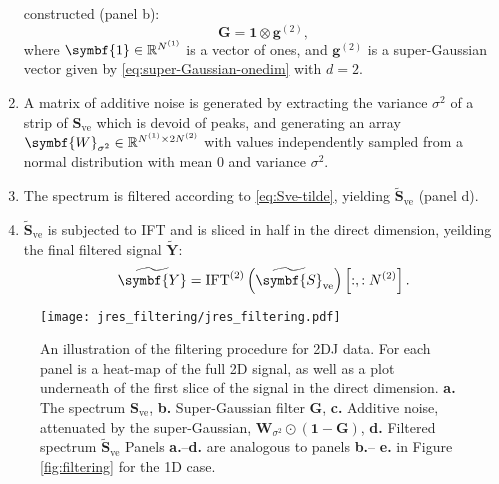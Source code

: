 \begin{enumerate}
        constructed (panel b):
        \begin{equation}
            \symbf{G} = \symbf{1} \otimes \symbf{g}^{(2)},
        \end{equation}
        where $\symbf{1} \in \mathbb{R}^{\None}$ is a vector of ones, and
        $\symbf{g}^{(2)}$ is a super-Gaussian vector given by
        \eqref{eq:super-Gaussian-onedim} with $d=2$.
    \item A matrix of additive noise is generated by extracting the variance
        $\sigma^2$ of a strip of $\symbf{S}_{\text{ve}}$ which is devoid of
        peaks, and generating an array $\symbf{W}_{\sigma^2} \in
        \mathbb{R}^{\None \times 2 \Ntwo}$ with values independently sampled
        from a normal distribution with mean $0$ and variance  $\sigma^2$.
    \item The spectrum is filtered according to \eqref{eq:Sve-tilde}, yielding
        $\widetilde{\symbf{S}}_{\text{ve}}$ (panel d).
    \item $\widetilde{\symbf{S}}_{\text{ve}}$ is subjected to \ac{IFT} and is
        sliced in half in the direct dimension, yeilding the final filtered
        signal $\widetilde{\symbf{Y}}$:
        \begin{equation}
            \widetilde{\symbf{Y}} = \IFT^{(2)}\left(\widetilde{\symbf{S}}_{\text{ve}}\right) \left[:, : \Ntwo\right].
        \end{equation}
\end{enumerate}

\begin{figure}
    \centering
    \texttt{[image: jres\_filtering/jres\_filtering.pdf]}
    \caption[
        An illustration of the filtering procedure for \ac{2DJ} data.
    ]
    {
        An illustration of the filtering procedure for \ac{2DJ} data.
        For each panel is a heat-map of the full \ac{2D} signal, as well as a
        plot underneath of the first slice of the signal in the direct
        dimension.
        \textbf{a.} The spectrum $\symbf{S}_{\text{ve}}$,
        \textbf{b.} Super-Gaussian filter $\symbf{G}$,
        \textbf{c.} Additive noise, attenuated by the super-Gaussian, $\symbf{W}_{\sigma^2} \odot (\symbf{1} - \symbf{G})$,
        \textbf{d.} Filtered spectrum $\widetilde{\symbf{S}}_{\text{ve}}$
        Panels \textbf{a.}--\textbf{d.} are analogous to panels \textbf{b.}--
        \textbf{e.} in Figure \ref{fig:filtering} for the \ac{1D} case.
    }
    \label{fig:jres-filtering}
\end{figure}


